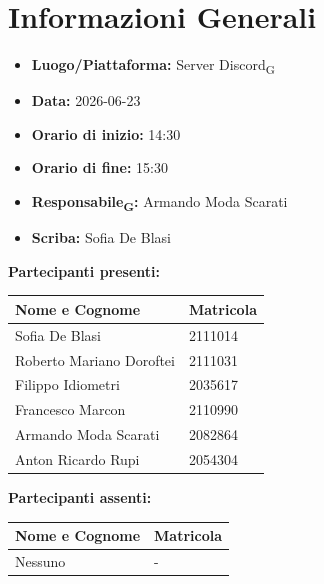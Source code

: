 \section{Informazioni Generali}
\begin{itemize}
    \item \textbf{Luogo/Piattaforma:} Server Discord\textsubscript{G}
    \item \textbf{Data:} 2026-06-23
    \item \textbf{Orario di inizio:} 14:30
    \item \textbf{Orario di fine:} 15:30
    \item \textbf{Responsabile\textsubscript{G}:} Armando Moda Scarati
    \item \textbf{Scriba:} Sofia De Blasi
\end{itemize}

\vspace{0.5cm}
\textbf{Partecipanti presenti:}
\begin{table}[ht]
    \centering
    \renewcommand{\arraystretch}{1.2}
    \begin{tabularx}{\textwidth}{X l}
        \toprule
        \textbf{Nome e Cognome} & \textbf{Matricola} \\
        \midrule
        Sofia De Blasi & 2111014 \\
        Roberto Mariano Doroftei & 2111031 \\
        Filippo Idiometri & 2035617 \\
        Francesco Marcon & 2110990 \\
        Armando Moda Scarati & 2082864 \\
        Anton Ricardo Rupi & 2054304 \\
        \bottomrule
    \end{tabularx}
\end{table}

\vspace{0.5cm}
\textbf{Partecipanti assenti:}
\begin{table}[ht]
    \centering
    \renewcommand{\arraystretch}{1.2}
    \begin{tabularx}{\textwidth}{X l}
        \toprule
        \textbf{Nome e Cognome} & \textbf{Matricola} \\
        \midrule
        Nessuno & - \\
        \bottomrule
    \end{tabularx}
\end{table}


